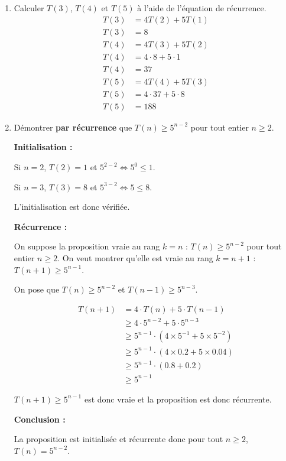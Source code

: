\documentclass[11pt]{article}
\begin{document}
\begin{enumerate}[label=\alph*)]

     \item Calculer $T(3)$, $T(4)$ et $T(5)$ à l'aide de l'équation de récurrence.
         \begin{align*} 
            T(3) &= 4T(2) + 5T(1)\\
            T(3) &= 8 
         \end{align*}
        \begin{align*} 
            T(4) &= 4T(3) + 5T(2)\\
            T(4) &= 4\cdot 8 + 5\cdot 1\\
            T(4) &= 37
        \end{align*}
        \begin{align*} 
            T(5) &= 4T(4) + 5T(3)\\
            T(5) &= 4\cdot 37 + 5\cdot 8\\
            T(5) &= 188
        \end{align*}
     
     \item Démontrer \textbf{par récurrence} que $T(n)\geq  5^{n-2}$ pour tout entier $n \geq 2$.

        \textbf{Initialisation :}
        
        Si $n=2$, $T(2)=1$ et $5^{2-2} \Leftrightarrow 5^0 \leq 1$.

        Si $n=3$, $T(3)=8$ et $5^{3-2} \Leftrightarrow 5 \leq 8$.

        L'initialisation est donc vérifiée.

        \bigskip

        \textbf{Récurrence :}

        On suppose la proposition vraie au rang $k = n$ : $T(n)\geq  5^{n-2}$ pour tout entier $n \geq 2$. On veut montrer qu'elle est vraie au rang $k = n+1$ :$T(n+1)\geq  5^{n-1}$.

        On pose que $T(n)\geq  5^{n-2}$ et $T(n-1)\geq  5^{n-3}$.

        \begin{align*}
            T(n+1) &= 4\cdot T(n) + 5\cdot T(n-1)\\
            &\geq 4\cdot 5^{n-2} + 5\cdot 5^{n-3}\\
            &\geq 5^{n-1}\cdot(4 \times 5^{-1} + 5\times 5^{-2})\\
            &\geq 5^{n-1}\cdot(4 \times 0.2 + 5\times 0.04)\\
            &\geq 5^{n-1}\cdot(0.8 + 0.2)\\
            &\geq 5^{n-1}
        \end{align*} 

        $T(n+1)\geq  5^{n-1}$ est donc vraie et la proposition est donc récurrente.
        
        \bigskip

        \textbf{Conclusion :}

        La proposition est initialisée et récurrente donc pour tout $n \geq 2$, $T(n) = 5^{n-2}$.   
\end{enumerate}
\end{document}
